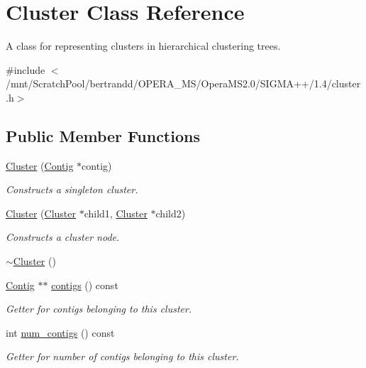 \hypertarget{classCluster}{
\section{Cluster Class Reference}
\label{classCluster}
}


A class for representing clusters in hierarchical clustering trees.  


{\ttfamily \#include $<$/mnt/ScratchPool/bertrandd/OPERA\_\-MS/OperaMS2.0/SIGMA++/1.4/cluster.h$>$}\subsection*{Public Member Functions}
\begin{DoxyCompactItemize}
\item 
\hyperlink{classCluster_a9f69adb0b24c9d63ef3a95902c07480d}{Cluster} (\hyperlink{classContig}{Contig} $\ast$contig)
\begin{DoxyCompactList}\small\item\em Constructs a singleton cluster. \item\end{DoxyCompactList}\item 
\hyperlink{classCluster_aa742def049dabe95e607db51d6a51333}{Cluster} (\hyperlink{classCluster}{Cluster} $\ast$child1, \hyperlink{classCluster}{Cluster} $\ast$child2)
\begin{DoxyCompactList}\small\item\em Constructs a cluster node. \item\end{DoxyCompactList}\item 
\hyperlink{classCluster_a4bddfc88ac859610acab15dd12851b58}{$\sim$Cluster} ()
\item 
\hyperlink{classContig}{Contig} $\ast$$\ast$ \hyperlink{classCluster_ae79428737f0fea472a2de3b394d405f3}{contigs} () const 
\begin{DoxyCompactList}\small\item\em Getter for contigs belonging to this cluster. \item\end{DoxyCompactList}\item 
int \hyperlink{classCluster_a460d16cd8eca858a6cab9995adea8746}{num\_\-contigs} () const 
\begin{DoxyCompactList}\small\item\em Getter for number of contigs belonging to this cluster. \item\end{DoxyCompactList}\item 
$$
\end{DoxyCompactItemize}

